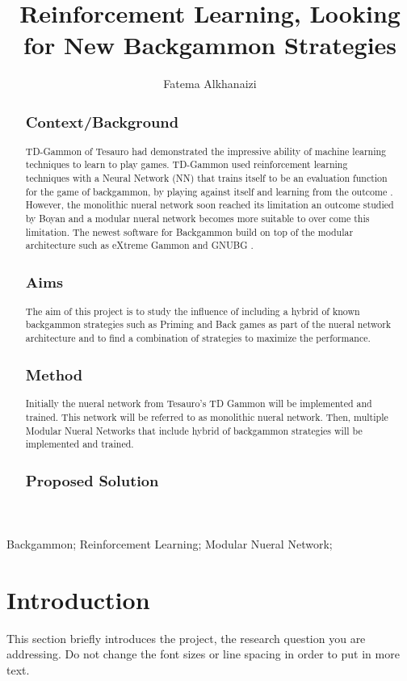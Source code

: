 \documentclass[12pt,a4paper]{article}
\title{Reinforcement Learning, Looking for New Backgammon Strategies}
\author{Fatema Alkhanaizi}
\date{}
\begin{document}
\maketitle

\begin{abstract}
\subsection{Context/Background}
TD-Gammon  of Tesauro \cite{DBLP:conf/icml/Tesauro92,DBLP:journals/ai/Tesauro02} had demonstrated the impressive ability of machine learning techniques to learn to play games. TD-Gammon used reinforcement learning techniques with a Neural Network (NN) that trains itself to be an evaluation function for the game of backgammon, by playing against itself and learning from the outcome \cite{DBLP:journals/ai/Tesauro02}. However, the monolithic nueral network soon reached its limitation an outcome studied by Boyan \cite{} and a modular nueral network becomes more suitable to over come this limitation. The newest software for Backgammon build on top of the modular architecture such as eXtreme Gammon \cite{exg} and GNUBG \cite{gnubg}.
\subsection{Aims}
The aim of this project is to study the influence of including a hybrid of known backgammon strategies such as Priming and Back games as part of the nueral network architecture and to find a combination of strategies to maximize the performance. 
\subsection{Method}
Initially the nueral network from Tesauro's TD Gammon will be implemented and trained. This network will be referred to as monolithic nueral network. Then, multiple Modular Nueral Networks that include hybrid of backgammon strategies will be implemented and trained. 
\subsection{Proposed Solution}

\end{abstract}
\begin{keywords}
Backgammon; Reinforcement Learning; Modular Nueral Network; 
\end{keywords}

\section{Introduction}
This section briefly introduces the project, the research question you are addressing.  Do not change the font sizes or line spacing in order to put in more text.
\end{document}
